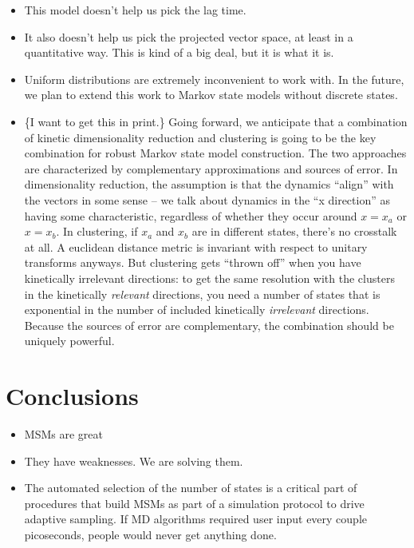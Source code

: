 \documentclass[twocolumn,floatfix,nofootinbib,aps]{revtex4-1}
\begin{document}
\begin{itemize}
\item This model doesn't help us pick the lag time.
\item It also doesn't help us pick the projected vector space, at least in a quantitative way. This is kind of a big deal, but it is what it is.
\item Uniform distributions are extremely inconvenient to work with. In the future, we plan to extend this work to Markov state models without discrete states.
\item \{I want to get this in print.\} Going forward, we anticipate that a combination of kinetic dimensionality reduction and clustering is going to be the key combination for robust Markov state model construction. The two approaches are characterized by complementary approximations and sources of error. In dimensionality reduction, the assumption is that the dynamics ``align'' with the vectors in some sense -- we talk about dynamics in the ``x direction'' as having some characteristic, regardless of whether they occur around $x=x_a$ or $x=x_b$. In clustering, if $x_a$ and $x_b$ are in different states, there's no crosstalk at all. A euclidean distance metric is invariant with respect to unitary transforms anyways. But clustering gets ``thrown off'' when you have kinetically irrelevant directions: to get the same resolution with the clusters in the kinetically \emph{relevant} directions, you need a number of states that is exponential in the number of included kinetically \emph{irrelevant} directions. Because the sources of error are complementary, the combination should be uniquely powerful.
\end{itemize}


\section{Conclusions}
\begin{itemize}
    \item MSMs are great
    \item They have weaknesses. We are solving them.
    \item The automated selection of the number of states is a critical part of procedures that build MSMs as part of a simulation protocol to drive adaptive sampling. If MD algorithms required user input every couple picoseconds, people would never get anything done.
\end{itemize}


\end{document}
